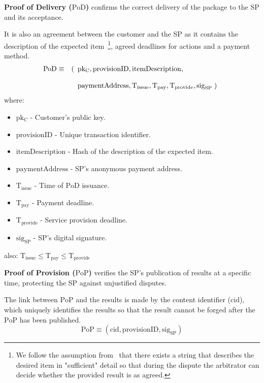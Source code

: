 \documentclass[pdftex,twocolumn,epjc3]{svjour3}
\begin{document}
\noindent \textbf{Proof of Delivery ($\mathrm{PoD}$)}\label{proof-of-delivery} confirms the correct delivery of the package to the SP and its acceptance.

It is also an agreement between the customer and the SP as it contains the description of the expected item~\footnote{We follow the assumption from~\cite{asokanFairnessElectronicCommerce1998} that there exists a string that describes the desired item in "sufficient" detail so that during the dispute the arbitrator can decide whether the provided result is as agreed.}, agreed deadlines for actions and a payment method.
\begin{eqnarray}
\mathrm{PoD} & \equiv & (\begin{array}[t]{l}\mathrm{pk_C}, \mathrm{provisionID},    \mathrm{itemDescription}, \\\\ 
\mathrm{paymentAddress}, \mathrm{T}_\mathrm{issue}, \mathrm{T}_\mathrm{pay}, \mathrm{T}_\mathrm{provide}, \mathrm{sig}_\mathrm{SP} \; )\end{array}
\end{eqnarray}
where:
\begin{itemize}
\item $\mathrm{pk_C}$ - Customer's public key.
\item $\mathrm{provisionID}$ - Unique transaction identifier.
\item $\mathrm{itemDescription}$ - Hash of the description of the expected item.
\item $\mathrm{paymentAddress}$ - SP's anonymous payment address.

\item $\mathrm{T}_\mathrm{issue}$ - Time of $\mathrm{PoD}$ issuance.
\item $\mathrm{T}_\mathrm{pay}$ - Payment deadline.
\item $\mathrm{T}_\mathrm{provide}$ - Service provision deadline.
\item $\mathrm{sig}_\mathrm{SP}$ - SP's digital signature.
\end{itemize}

also:
\(\mathrm{T}_\mathrm{issue} \leq \mathrm{T}_\mathrm{pay} \leq \mathrm{T}_\mathrm{provide}\)

\noindent \textbf{Proof of Provision ($\mathrm{PoP}$)}\label{proof-of-provision} verifies the SP's publication of results at a specific time, protecting the SP against unjustified disputes.

The link between $\mathrm{PoP}$ and the results is made by the content identifier ($\mathrm{cid}$), which uniquely identifies the results so that the result cannot be forged after the $\mathrm{PoP}$ has been published.
\begin{equation}
\mathrm{PoP} \equiv (\mathrm{cid}, \mathrm{provisionID}, \mathrm{sig}_\mathrm{SP})
\end{equation}
\end{document}
